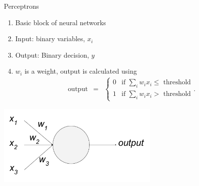 \documentclass[handout]{beamer}
\begin{document}
\begin{frame}{Perceptrons}
\begin{enumerate}
  \item Basic block of neural networks \\

  \item Input: binary variables, $x_i$ \\

  \item Output: Binary decision, $y$ \\

  \item $w_i$ is a weight, output is calculated using \\

  \begin{eqnarray}
  \mbox{output} & = & \left\{ \begin{array}{ll}
      0 & \mbox{if } \sum_i w_i x_i \leq \mbox{ threshold} \\
      1 & \mbox{if } \sum_i w_i x_i > \mbox{ threshold}
      \end{array} .
\end{eqnarray}
\end{enumerate}
    \begin{center}
      \includegraphics[width=0.8\linewidth, height=4cm]{images/perceptron}
    \end{center}
\end{frame}
\end{document}
